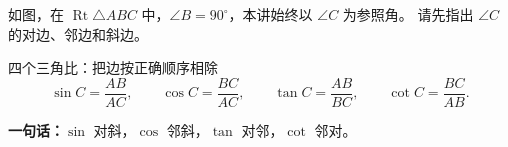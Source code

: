 \documentclass{exam-zh}
\begin{document}

\begin{eduProblemBlock}[统一构型]
\noindent
\begin{minipage}[t]{\dimexpr\linewidth-70mm-6mm\relax}
\vspace{0pt}
如图，在 $\operatorname{Rt}\triangle ABC$ 中，$\angle B=90^\circ$，本讲始终以 $\angle C$ 为参照角。
请先指出 $\angle C$ 的对边、邻边和斜边。

\end{minipage}\hfill
\begin{diagramcoltikz}{70mm}{先盯住 $\angle C$：哪条边不碰它，哪条边碰它但不是斜边？}
}
\end{diagramcoltikz}
\end{eduProblemBlock}










\begin{eduDualExplain}
  \begin{eduExplainLeft}
  \end{eduExplainLeft}

  \begin{eduExplainRight}
      
      
      
  \end{eduExplainRight}
\end{eduDualExplain}





\begin{eduSolutionBox}{四个三角比：把边按正确顺序相除}
  \begingroup
  \setlength{\parskip}{2.5mm}
\[
\sin C=\frac{AB}{AC},\qquad
\cos C=\frac{BC}{AC},\qquad
\tan C=\frac{AB}{BC},\qquad
\cot C=\frac{BC}{AB}.
\]
\par
\textbf{一句话：}$\sin$ 对斜，$\cos$ 邻斜，$\tan$ 对邻，$\cot$ 邻对。\par
  \endgroup
\end{eduSolutionBox}
\end{document}
